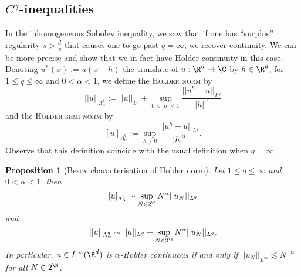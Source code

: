 \documentclass[reqno]{amsart}
\newtheorem{proposition}[theorem]{Proposition}
\theoremstyle{definition}
\theoremstyle{remark}
\renewcommand{\emph}{\textsc}
\begin{document}
\subsection{$C^\gamma$-inequalities}

In the inhomogeneous Sobolev inequality, we saw that if one has ``surplus'' regularity $s > \tfrac{d}{p}$ that causes one to go past $q = \infty$, we recover continuity. We can be more precise and show that we in fact have Holder continuity in this case. Denoting $u^h (x) := u(x - h)$ the translate of $u : \R^d \to \C$ by $h \in \R^d$, for $1 \leq q \leq \infty$ and $0 < \alpha < 1$, we define the \emph{Holder norm} by 
	\[ ||u||_{\Lambda^q_\alpha} := ||u||_{L^q} + \sup_{0 < |h| \leq 1} \frac{||u^h - u||_{L^q}}{|h|^\alpha} \]
and the \emph{Holder semi-norm} by 
	\[ [u]_{\Lambda^q_\alpha} :=  \sup_{h \neq 0} \frac{||u^h - u||_{L^q}}{|h|^\alpha}. \]	
Observe that this definition coincide with the usual definition when $q = \infty$.

\begin{proposition}[Besov characterisation of Holder norm]
	Let $1 \leq q \leq \infty$ and $0 < \alpha < 1$, then 
		\[ [u]_{\Lambda^q_\alpha} \sim  \sup_{N \in 2^\Z} N^\alpha ||u_N||_{L^q} \]
	and
		\[ ||u||_{\Lambda^q_\alpha} \sim ||u||_{L^q} + \sup_{N \in 2^\N} N^\alpha ||u_N||_{L^q}. \]
	In particular, $u \in L^\infty (\R^d)$ is $\alpha$-Holder continuous if and only if $||u_N||_{L^\infty} \lesssim N^{-\alpha}$ for all $N \in 2^\N$. 
\end{proposition}
\end{document}
